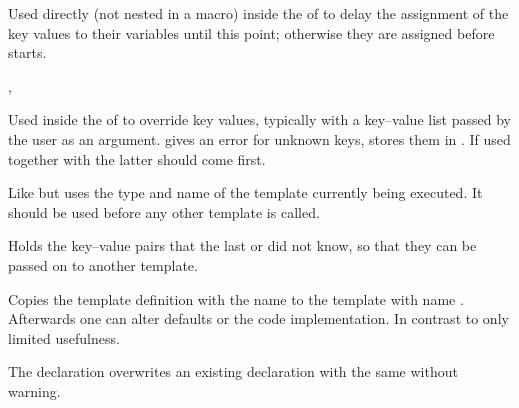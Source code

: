 \documentclass{l3in2edoc}
\begin{document}
\begin{function}[]
  {
    \AssignTemplateKeys
  }
  Used directly (not nested in a macro) inside the  of
   to delay the assignment of the key values
  to their variables until this point; otherwise they are assigned
  before  starts.
\end{function}



\begin{function}[]
  {
    \SetTemplateKeys,
    \SetKnownTemplateKeys
  }
  \begin{syntax}
       
  \end{syntax}
  Used inside the  of  to
  override key values, typically with a key--value list passed by
  the user as an argument.  gives an error for
  unknown keys,  stores them in
  . If used together with
   the latter should come first.
\end{function}



\begin{function}[]
  {
    \SetCurrentKnownTemplateKeys
  }
  \begin{syntax}
     
  \end{syntax}
  Like  but uses the type and name of the
  template currently being executed. It should be used before any
  other template is called.
\end{function}


\begin{variable}[]
  {
    \UnusedTemplateKeys
  }
  Holds the key--value pairs that the last
   or  did
  not know, so that they can be passed on to another template.
\end{variable}




\begin{function}[]
  {
    \DeclareTemplateCopy
  }
  \begin{syntax}
       
  \end{syntax}
  Copies the template definition with the name  to the
  template with name .
%
  Afterwards one can alter defaults or the code implementation. In
  contrast to  only limited usefulness.

  The declaration overwrites an existing declaration with the same
   without warning.
\end{function}
\end{document}
